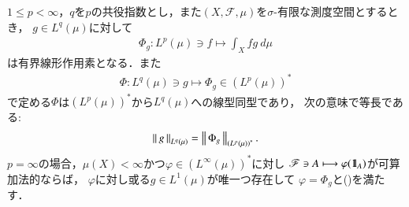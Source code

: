 	\begin{screen}
		\begin{thm}[$L^p$の共役空間]\label{thm:dual_space_of_L_p}
			$1 \leq p < \infty$，$q$を$p$の共役指数とし，また$(X,\mathscr{F},\mu)$を$\sigma$-有限な測度空間とするとき，
			$g \in L^q(\mu)$に対して
			\begin{align}
				\Phi_g: L^p(\mu) \ni f \longmapsto \int_X fg\ d\mu
				\label{eq:thm_dual_space_of_L_p_1}
			\end{align}
			は有界線形作用素となる．また
			\begin{align}
				\Phi: L^q(\mu) \ni g \longmapsto \Phi_g \in \left( L^p(\mu) \right)^*
			\end{align}
			で定める$\Phi$は$\left( L^p(\mu) \right)^*$から$L^q(\mu)$への線型同型であり，
			次の意味で等長である:
			\begin{align}
				\left\|\, g\, \right\|_{L^q(\mu)} = \left\|\, \Phi_g\, \right\|_{\left( L^p(\mu) \right)^*}.
				\label{eq:thm_dual_space_of_L_p_asseretion_2}
			\end{align}
			$p=\infty$の場合，$\mu(X) < \infty$かつ$\varphi \in \left( L^\infty(\mu) \right)^*$に対し
			$\mathscr{F} \ni A \longmapsto \varphi(\mbox{1}\hspace{-0.25em}\mbox{l}_A)$が可算加法的ならば，
			$\varphi$に対し或る$g \in L^1(\mu)$が唯一つ存在して
			$\varphi = \Phi_g$と()を満たす．
		\end{thm}
	\end{screen}
	
